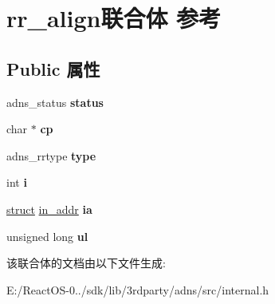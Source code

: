 \hypertarget{unionrr__align}{}\section{rr\+\_\+align联合体 参考}
\label{unionrr__align}
\subsection*{Public 属性}
\begin{DoxyCompactItemize}
\item 
\mbox{\label{unionrr__align_aa10c57d1e4c1716fbd3cdc30f144819c}} 
adns\+\_\+status {\bfseries status}
\item 
\mbox{\label{unionrr__align_a13146ecd9ebd5dbea14ab2a8c8bb256a}} 
char $\ast$ {\bfseries cp}
\item 
\mbox{\label{unionrr__align_add5d2aa37a38117bc05ba8b3dd6c6e3a}} 
adns\+\_\+rrtype {\bfseries type}
\item 
\mbox{\label{unionrr__align_af98e1b6295746880a7bcdfbb1e0ba545}} 
int {\bfseries i}
\item 
\mbox{\label{unionrr__align_abcd75c10271654cc2cb0348ee8653f07}} 
\hyperlink{interfacestruct}{struct} \hyperlink{structin__addr}{in\+\_\+addr} {\bfseries ia}
\item 
\mbox{\label{unionrr__align_a52c9881ccc3877070997ddcbc30b649e}} 
unsigned long {\bfseries ul}
\end{DoxyCompactItemize}


该联合体的文档由以下文件生成\+:\begin{DoxyCompactItemize}
\item 
E\+:/\+React\+O\+S-\/0../sdk/lib/3rdparty/adns/src/internal.\+h\end{DoxyCompactItemize}
